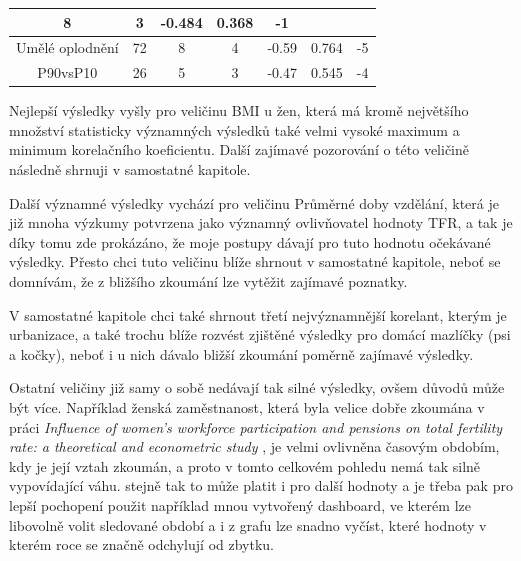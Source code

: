 \documentclass[thesis=M,czech]{FITthesis}[2022/10/08]
\begin{document}
\begin{table}[h]
{\begin{tabular}{@{}ccccccc@{}}
  \multicolumn{1}{c|}{8} &
  \multicolumn{1}{c|}{3} &
  \multicolumn{1}{c|}{-0.484} &
  \multicolumn{1}{c|}{0.368} &
  \multicolumn{1}{c|}{-1} \\ \midrule
\multicolumn{1}{|c|}{Umělé oplodnění} &
  \multicolumn{1}{c|}{72} &
  \multicolumn{1}{c|}{8} &
  \multicolumn{1}{c|}{4} &
  \multicolumn{1}{c|}{-0.59} &
  \multicolumn{1}{c|}{0.764} &
  \multicolumn{1}{c|}{-5} \\ \midrule
\multicolumn{1}{|c|}{P90vsP10} &
  \multicolumn{1}{c|}{26} &
  \multicolumn{1}{c|}{5} &
  \multicolumn{1}{c|}{3} &
  \multicolumn{1}{c|}{-0.47} &
  \multicolumn{1}{c|}{0.545} &
  \multicolumn{1}{c|}{-4} \\ \midrule
\bottomrule
\end{tabular}%
}
\end{table}

Nejlepší výsledky vyšly pro veličinu BMI u žen, která má kromě největšího množství statisticky významných výsledků také velmi vysoké maximum a minimum korelačního koeficientu. Další zajímavé pozorování o této veličině následně shrnuji v samostatné kapitole.

Další významné výsledky vychází pro veličinu Průměrné doby vzdělání, která je již mnoha výzkumy potvrzena jako významný ovlivňovatel hodnoty TFR, a tak je díky tomu zde prokázáno, že moje postupy dávají pro tuto hodnotu očekávané výsledky. Přesto chci tuto veličinu blíže shrnout v samostatné kapitole, neboť se domnívám, že z bližšího zkoumání lze vytěžit zajímavé poznatky.

V samostatné kapitole chci také shrnout třetí nejvýznamnější korelant, kterým je urbanizace, a také trochu blíže rozvést zjištěné výsledky pro domácí mazlíčky (psi a kočky), neboť i u nich dávalo bližší zkoumání poměrně zajímavé výsledky.

Ostatní veličiny již samy o sobě nedávají tak silné výsledky, ovšem důvodů může být více. Například ženská zaměstnanost, která byla velice dobře zkoumána v práci \textit{Influence of women’s workforce participation and pensions on total fertility rate: a theoretical and econometric study} \cite{Evan}, je velmi ovlivněna časovým obdobím, kdy je její vztah zkoumán, a proto v tomto celkovém pohledu nemá tak silně vypovídající váhu. stejně tak to může platit i pro další hodnoty a je třeba pak pro lepší pochopení použit například mnou vytvořený dashboard, ve kterém lze libovolně volit sledované období a i z grafu lze snadno vyčíst, které hodnoty v kterém roce se značně odchylují od zbytku.
\end{document}
